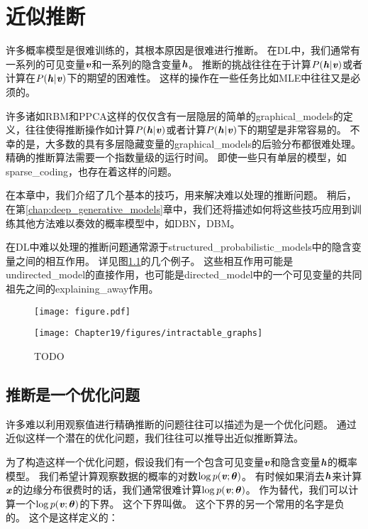 \chapter{近似推断}
\label{chap:approximate_inference}


许多概率模型是很难训练的，其根本原因是很难进行推断。
在\gls{DL}中，我们通常有一系列的可见变量$\boldsymbol{\mathit{v}}$和一系列的隐含变量$\boldsymbol{\mathit{h}}$。
推断的挑战往往在于计算$P(\boldsymbol{\mathit{h}}\vert\boldsymbol{\mathit{v}})$或者计算在$P(\boldsymbol{\mathit{h}}\vert\boldsymbol{\mathit{v}})$下的期望的困难性。
这样的操作在一些任务比如\gls{MLE}中往往又是必须的。

许多诸如\gls{RBM}和\gls{PPCA}这样的仅仅含有一层隐层的简单的\gls{graphical_models}的定义，往往使得推断操作如计算$P(\boldsymbol{\mathit{h}}\vert\boldsymbol{\mathit{v}})$或者计算$P(\boldsymbol{\mathit{h}}\vert\boldsymbol{\mathit{v}})$下的期望是非常容易的。
不幸的是，大多数的具有多层隐藏变量的\gls{graphical_models}的后验分布都很难处理。
精确的推断算法需要一个指数量级的运行时间。
即使一些只有单层的模型，如\gls{sparse_coding}，也存在着这样的问题。


在本章中，我们介绍了几个基本的技巧，用来解决难以处理的推断问题。
稍后，在第\ref{chap:deep_generative_models}章中，我们还将描述如何将这些技巧应用到训练其他方法难以奏效的概率模型中，如\gls{DBN}，\gls{DBM}。


在\gls{DL}中难以处理的推断问题通常源于\gls{structured_probabilistic_models}中的隐含变量之间的相互作用。
详见图\ref{fig:intractable_graphs}的几个例子。
这些相互作用可能是\gls{undirected_model}的直接作用，也可能是\gls{directed_model}中的一个可见变量的共同祖先之间的\gls{explaining_away}作用。


\begin{figure}[!htb]
\ifOpenSource
\centerline{\texttt{[image: figure.pdf]}}
\else
	\centerline{\texttt{[image: Chapter19/figures/intractable\_graphs]}}
\fi
	\caption{TODO}
	\label{fig:intractable_graphs}
\end{figure}


\section{推断是一个优化问题}
\label{sec:inference_as_optimization}

许多难以利用观察值进行精确推断的问题往往可以描述为是一个优化问题。
通过近似这样一个潜在的优化问题，我们往往可以推导出近似推断算法。


为了构造这样一个优化问题，假设我们有一个包含可见变量$\boldsymbol{\mathit{v}}$和隐含变量$\boldsymbol{\mathit{h}}$的概率模型。
我们希望计算观察数据的概率的对数$\log p(\boldsymbol{\mathit{v}};\boldsymbol{\theta})$。
有时候如果消去$\boldsymbol{\mathit{h}}$来计算$\boldsymbol{\mathit{x}}$的边缘分布很费时的话，我们通常很难计算$\log p(\boldsymbol{\mathit{v}};\boldsymbol{\theta})$。
作为替代，我们可以计算一个$\log p(\boldsymbol{\mathit{v}};\boldsymbol{\theta})$的下界。
这个下界叫做。
这个下界的另一个常用的名字是负的。
这个是这样定义的：

